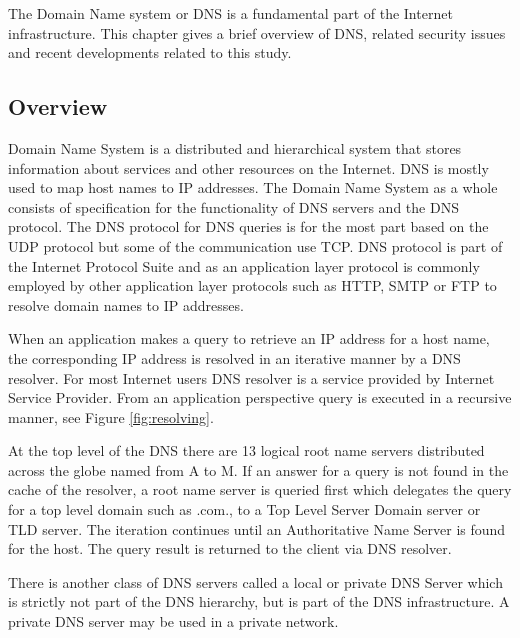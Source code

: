 The Domain Name system or DNS \cite{RFC1035}\cite{RFC1034} is a fundamental part of the Internet infrastructure. This chapter gives a brief overview of DNS, related security issues and recent developments related to this study.

\subsection{Overview}
Domain Name System is a distributed and hierarchical system that stores information about services and other resources on the Internet. DNS is mostly used to map host names to IP addresses. The Domain Name System as a whole consists of specification for the functionality of DNS servers and the DNS protocol. The DNS protocol for DNS queries is for the most part based on the UDP protocol but some of the communication use TCP. DNS protocol is part of the Internet Protocol Suite and as an application layer protocol is commonly employed by other application layer protocols such as HTTP, SMTP or FTP to resolve domain names to IP addresses. \citep{kurose_ross}\cite{tanenbaum} 

When an application makes a query to retrieve an IP address for a host name, the corresponding IP address is resolved in an iterative manner by a DNS resolver. For most Internet users DNS resolver is a service provided by Internet Service Provider. From an application perspective query is executed in a recursive manner, see Figure \ref{fig:resolving}.  

At the top level of the DNS there are 13 logical root name servers distributed across the globe named from A to M. If an answer for a query is not found in the cache of the resolver, a root name server is queried first which delegates the query for a top level domain such as .com., to a Top Level Server Domain server or TLD server. The iteration continues until an Authoritative Name Server is found for the host. The query result is returned to the client via DNS resolver. \citep{kurose_ross} \cite{tanenbaum} 

There is another class of DNS servers called a local or private DNS Server which is strictly not part of the DNS hierarchy, but is part of the DNS infrastructure. A private DNS server may be used in a private network. \citep{kurose_ross}


